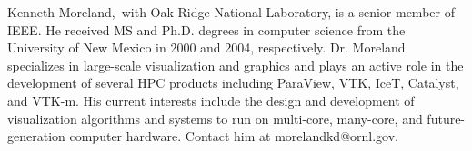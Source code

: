 \documentclass{IEEEcsmag}
\begin{document}
\begin{IEEEbiography}{Kenneth Moreland,}{\,} with Oak Ridge National Laboratory, is a senior member of IEEE.
  He received MS and Ph.D. degrees in computer science from the University of New Mexico in 2000 and 2004, respectively.
  Dr. Moreland specializes in large-scale visualization and graphics and plays an active role in the development of several HPC products including ParaView, VTK, IceT, Catalyst, and VTK-m.
  His current interests include the design and development of visualization algorithms and systems to run on multi-core, many-core, and future-generation computer hardware.
  Contact him at morelandkd@ornl.gov.
\end{IEEEbiography}
\end{document}
